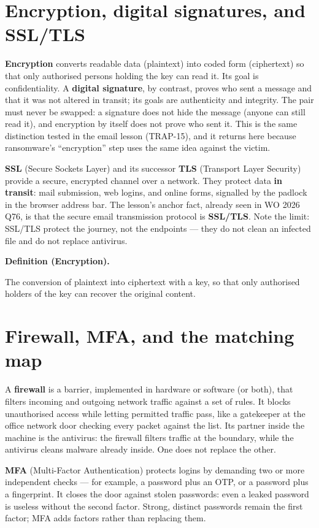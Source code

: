 \documentclass[11pt]{article}
\newenvironment{definitionbox}[1]{%
  \par\noindent\textbf{Definition (#1).}\ \itshape
}{\par\vspace{0.3em}}
\begin{document}
\section{Encryption, digital signatures, and SSL/TLS}
\textbf{Encryption} converts readable data (plaintext) into coded form
(ciphertext) so that only authorised persons holding the key can read it.
Its goal is confidentiality. A \textbf{digital signature}, by contrast,
proves who sent a message and that it was not altered in transit; its goals
are authenticity and integrity. The pair must never be swapped: a signature
does not hide the message (anyone can still read it), and encryption by
itself does not prove who sent it. This is the same distinction tested in
the email lesson (TRAP-15), and it returns here because ransomware's
``encryption'' step uses the same idea against the victim.

\textbf{SSL} (Secure Sockets Layer) and its successor \textbf{TLS}
(Transport Layer Security) provide a secure, encrypted channel over a
network. They protect data \textbf{in transit}: mail submission, web
logins, and online forms, signalled by the padlock in the browser address
bar. The lesson's anchor fact, already seen in WO 2026 Q76, is that the
secure email transmission protocol is \textbf{SSL/TLS}. Note the limit:
SSL/TLS protect the journey, not the endpoints --- they do not clean an
infected file and do not replace antivirus.

\begin{definitionbox}{Encryption}
The conversion of plaintext into ciphertext with a key, so that only
authorised holders of the key can recover the original content.
\end{definitionbox}

\section{Firewall, MFA, and the matching map}
A \textbf{firewall} is a barrier, implemented in hardware or software (or
both), that filters incoming and outgoing network traffic against a set of
rules. It blocks unauthorised access while letting permitted traffic pass,
like a gatekeeper at the office network door checking every packet against
the list. Its partner inside the machine is the antivirus: the firewall
filters traffic at the boundary, while the antivirus cleans malware already
inside. One does not replace the other.

\textbf{MFA} (Multi-Factor Authentication) protects logins by demanding two
or more independent checks --- for example, a password plus an OTP, or a
password plus a fingerprint. It closes the door against stolen passwords:
even a leaked password is useless without the second factor. Strong,
distinct passwords remain the first factor; MFA adds factors rather than
replacing them.
\end{document}
